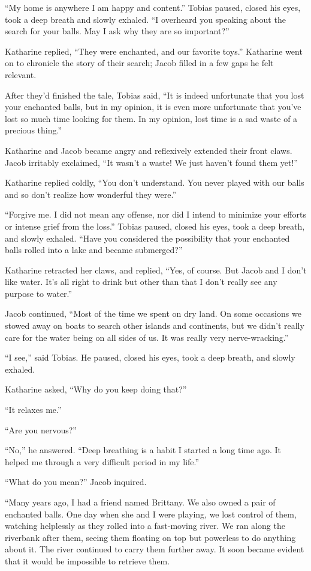 “My home is anywhere I am happy and content.” Tobias paused, closed his eyes, took a deep breath and slowly exhaled. “I overheard you speaking about the search for your balls. May I ask why they are so important?”

Katharine replied, “They were enchanted, and our favorite toys.” Katharine went on to chronicle the story of their search; Jacob filled in a few gaps he felt relevant.

After they'd finished the tale, Tobias said, “It is indeed unfortunate that you lost your enchanted balls, but in my opinion, it is even more unfortunate that you've lost so much time looking for them. In my opinion, lost time is a sad waste of a precious thing.”

Katharine and Jacob became angry and reflexively extended their front claws. Jacob irritably exclaimed, “It wasn't a waste! We just haven't found them yet!”

Katharine replied coldly, “You don't understand. You never played with our balls and so don't realize how wonderful they were.”

“Forgive me. I did not mean any offense, nor did I intend to minimize your efforts or intense grief from the loss.” Tobias paused, closed his eyes, took a deep breath, and slowly exhaled. “Have you considered the possibility that your enchanted balls rolled into a lake and became submerged?”

Katharine retracted her claws, and replied, “Yes, of course. But Jacob and I don't like water. It's all right to drink but other than that I don't really see any purpose to water.”

Jacob continued, “Most of the time we spent on dry land. On some occasions we stowed away on boats to search other islands and continents, but we didn't really care for the water being on all sides of us. It was really very nerve-wracking.”

“I see,” said Tobias. He paused, closed his eyes, took a deep breath, and slowly exhaled.

Katharine asked, “Why do you keep doing that?”

“It relaxes me.”

“Are you nervous?”

“No,” he answered. “Deep breathing is a habit I started a long time ago. It helped me through a very difficult period in my life.”

“What do you mean?” Jacob inquired.

“Many years ago, I had a friend named Brittany. We also owned a pair of enchanted balls. One day when she and I were playing, we lost control of them, watching helplessly as they rolled into a fast-moving river. We ran along the riverbank after them, seeing them floating on top but powerless to do anything about it. The river continued to carry them further away. It soon became  evident that it would be impossible to retrieve them.

